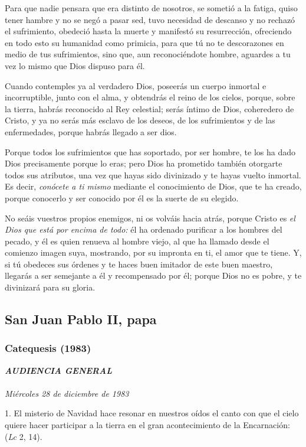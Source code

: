 Para que nadie pensara que era distinto de nosotros, se sometió a la fatiga, quiso tener hambre y no se negó a pasar sed, tuvo necesidad de descanso y no rechazó el sufrimiento, obedeció hasta la muerte y manifestó su resurrección, ofreciendo en todo esto su humanidad como primicia, para que tú no te descorazones en medio de tus sufrimientos, sino que, aun reconociéndote hombre, aguardes a tu vez lo mismo que Dios dispuso para él.

Cuando contemples ya al verdadero Dios, poseerás un cuerpo inmortal e incorruptible, junto con el alma, y obtendrás el reino de los cielos, porque, sobre la tierra, habrás reconocido al Rey celestial; serás íntimo de Dios, coheredero de Cristo, y ya no serás más esclavo de los deseos, de los sufrimientos y de las enfermedades, porque habrás llegado a ser dios.

Porque todos los sufrimientos que has soportado, por ser hombre, te los ha dado Dios precisamente porque lo eras; pero Dios ha prometido también otorgarte todos sus atributos, una vez que hayas sido divinizado y te hayas vuelto inmortal. Es decir, \emph{conócete a ti mismo} mediante el conocimiento de Dios, que te ha creado, porque conocerlo y ser conocido por él es la suerte de su elegido.

No seáis vuestros propios enemigos, ni os volváis hacia atrás, porque Cristo es \emph{el Dios que está por encima de todo:} él ha ordenado purificar a los hombres del pecado, y él es quien renueva al hombre viejo, al que ha llamado desde el comienzo imagen suya, mostrando, por su impronta en ti, el amor que te tiene. Y, si tú obedeces sus órdenes y te haces buen imitador de este buen maestro, llegarás a ser semejante a él y recompensado por él; porque Dios no es pobre, y te divinizará para su gloria.


\subsection{San Juan Pablo II, papa}

\subsubsection{Catequesis (1983)} \textbf{\emph{AUDIENCIA GENERAL\\ }}\\ \emph{Miércoles 28 de diciembre de 1983}



1. El misterio de Navidad hace resonar en nuestros oídos el canto con que el cielo quiere hacer participar a la tierra en el gran acontecimiento de la Encarnación:  (\emph{Lc} 2, 14).

